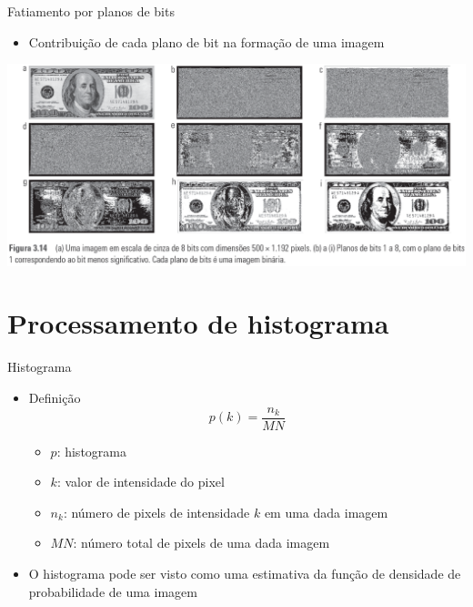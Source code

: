     \begin{slide}[toc=]{Fatiamento por planos de bits}
      \begin{itemize}
         \item Contribuição de cada plano de bit na formação de uma imagem
      \end{itemize}
         \begin{center}
             \includegraphics[width=\textwidth]{figs/fig0314}
         \end{center}
    \end{slide}
    
   \section[ slide = true]{Processamento de histograma}
   \begin{slide}[toc=]{Histograma}
      \begin{itemize}[type=1]
         \item Definição
         \begin{equation*}
             p(k) = \frac{n_k}{MN}
         \end{equation*}
         \begin{itemize}
            \item $p$: histograma
            \item $k$: valor de intensidade do pixel
            \item $n_k$: número de pixels de intensidade $k$ em uma dada imagem
            \item $MN$: número total de pixels de uma dada imagem
         \end{itemize}
         \item O histograma pode ser visto como uma estimativa da função de densidade de probabilidade de uma imagem
      \end{itemize}
   \end{slide}

